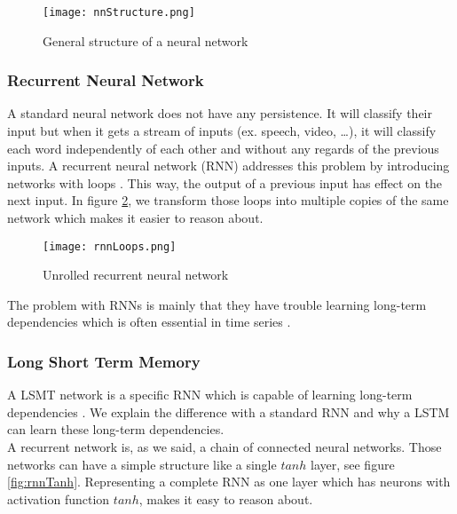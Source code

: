 \begin{figure}[!htb]
	\centering
	\texttt{[image: nnStructure.png]}
	\caption{General structure of a neural network \cite{IMECJaak}}
	\label{fig:nnStructure}
\end{figure} 

\subsubsection{Recurrent Neural Network}
\label{sec:rnn}

A standard neural network does not have any persistence. It will classify their input but when it gets a stream of inputs (ex. speech, video, \ldots), it will classify each word independently of each other and without any regards of the previous inputs. A recurrent neural network (RNN) addresses this problem by introducing networks with loops \cite{rnnOrigin:article}. This way, the output of a previous input has effect on the next input. In figure \ref{fig:rnnLoops}, we transform those loops into multiple copies of the same network which makes it easier to reason about. \\

\begin{figure}[!htb]
	\centering
	\texttt{[image: rnnLoops.png]}
	\caption{Unrolled recurrent neural network \cite{IMECJaak}}
	\label{fig:rnnLoops}
\end{figure} 

The problem with RNNs is mainly that they have trouble learning long-term dependencies which is often essential in time series \cite{longDepRNN:article}.


\subsubsection{Long Short Term Memory}
\label{sec:lstm}

A LSMT network is a specific RNN which is capable of learning long-term dependencies \cite{lstmDep:thesis}. We explain the difference with a standard RNN and why a LSTM can learn these long-term dependencies. \\

A recurrent network is, as we said, a chain of connected neural networks. Those networks can have a simple structure like a single $tanh$ layer, see figure \ref{fig:rnnTanh}. Representing a complete RNN as one layer which has neurons with activation function $tanh$, makes it easy to reason about. \\

